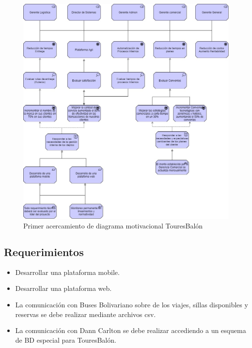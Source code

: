 \documentclass[12pt]{article}
\begin{document}
\begin{figure}[ht]
\centering
\centering
\includegraphics[scale=0.4]{imag/diagrama.jpeg}
\caption{Primer acercamiento de diagrama motivacional TouresBalón}
\label{1}
\end{figure}
\FloatBarrier











\subsection{ Requerimientos}

\begin{itemize}
    \item Desarrollar una plataforma mobile.
    \item Desarrollar una plataforma web.
    \item La comunicación con Buses Bolivariano sobre de los viajes, sillas disponibles y reservas se debe realizar mediante archivos csv.
    \item La comunicación con Dann Carlton se debe realizar accediendo a un esquema de BD especial para TouresBalón.
\end{itemize}
\end{document}
